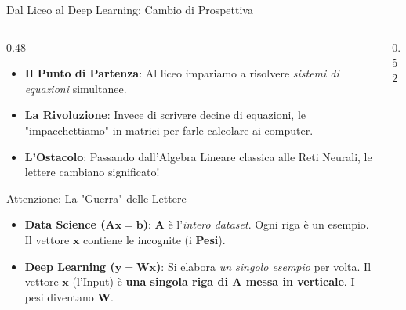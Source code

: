 \documentclass[aspectratio=169, 10pt]{beamer}
\begin{document}
\begin{frame}{Dal Liceo al Deep Learning: Cambio di Prospettiva}
    \begin{columns}[T]
        \begin{column}{0.48\textwidth}
            \vspace{0.2cm}
            \small
            \begin{itemize}
                \setlength\itemsep{0.7em}
                \item \textbf{Il Punto di Partenza}: Al liceo impariamo a risolvere \textit{sistemi di equazioni} simultanee.
                
                \item \textbf{La Rivoluzione}: Invece di scrivere decine di equazioni, le "impacchettiamo" in matrici per farle calcolare ai computer.
                
                \item \textbf{L'Ostacolo}: Passando dall'Algebra Lineare classica alle Reti Neurali, le lettere cambiano significato!
            \end{itemize}
            
            \vspace{0.2cm}
            \begin{alertblock}{Attenzione: La "Guerra" delle Lettere}
                \footnotesize
                \begin{itemize}
                    \setlength\itemsep{0.5em}
                    \item \textbf{Data Science ($\mathbf{A}\mathbf{x} = \mathbf{b}$)}: 
                    $\mathbf{A}$ è l'\textit{intero dataset}. Ogni riga è un esempio. Il vettore $\mathbf{x}$ contiene le incognite (i \textbf{Pesi}).
                    
                    \item \textbf{Deep Learning ($\mathbf{y} = \mathbf{W}\mathbf{x}$)}: 
                    Si elabora \textit{un singolo esempio} per volta. Il vettore $\mathbf{x}$ (l'Input) è \textbf{una singola riga di $\mathbf{A}$ messa in verticale}. I pesi diventano $\mathbf{W}$.
                \end{itemize}
            \end{alertblock}
            
        \end{column}
        
        \begin{column}{0.52\textwidth}
            \centering
            

\end{column}
\end{columns}
\end{frame}
\end{document}

